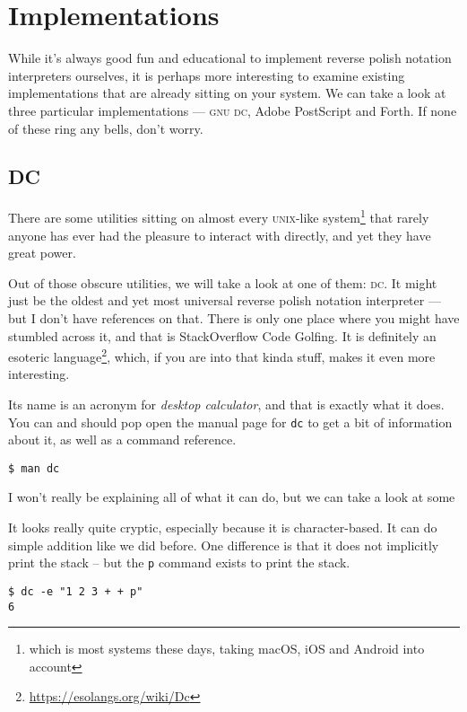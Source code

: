 \documentclass[a4paper,twocolumn]{article}
\begin{document}
\section{Implementations}

While it's always good fun and educational to implement reverse polish notation interpreters ourselves, it is perhaps more interesting to examine existing implementations that are already sitting on your system. We can take a look at three particular implementations — \textsc{gnu dc}, Adobe PostScript and Forth. If none of these ring any bells, don't worry. 

\subsection{DC}

There are some utilities sitting on almost every \textsc{unix}-like system\footnote{which is most systems these days, taking macOS, iOS and Android into account} that rarely anyone has ever had the pleasure to interact with directly, and yet they have great power.

Out of those obscure utilities, we will take a look at one of them: \textsc{dc}. It might just be the oldest and yet most universal reverse polish notation interpreter — but I don't have references on that. There is only one place where you might have stumbled across it, and that is StackOverflow Code Golfing. It is definitely an esoteric language\footnote{\url{https://esolangs.org/wiki/Dc}}, which, if you are into that kinda stuff, makes it even more interesting.

 Its name is an acronym for \emph{desktop calculator}, and that is exactly what it does. You can and should pop open the manual page for \verb|dc| to get a bit of information about it, as well as a command reference.

\begin{verbatim}
$ man dc
\end{verbatim}

I won't really be explaining all of what it can do, but we can take a look at some 

It looks really quite cryptic, especially because it is character-based. It can do simple addition like we did before. One difference is that it does not implicitly print the stack -- but the \verb|p| command exists to print the stack.

\begin{verbatim}
$ dc -e "1 2 3 + + p"
6
\end{verbatim}
\end{document}
